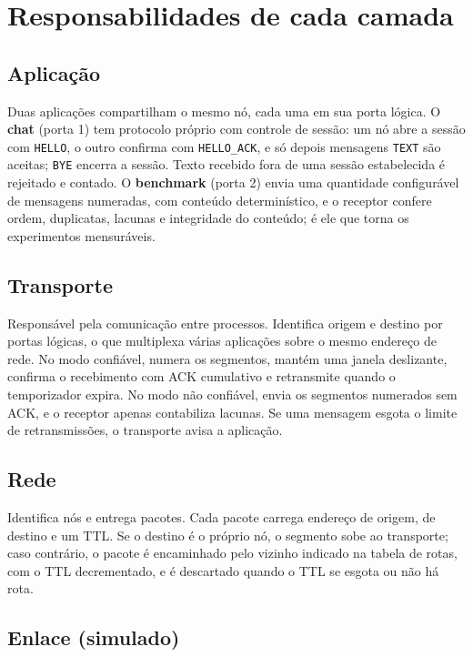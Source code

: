 \documentclass[11pt,a4paper]{article}
\begin{document}
\section{Responsabilidades de cada camada}

\subsection{Aplica\c{c}\~ao}

Duas aplica\c{c}\~oes compartilham o mesmo n\'o, cada uma em sua porta l\'ogica. O \textbf{chat} (porta 1) tem protocolo pr\'oprio com controle de sess\~ao: um n\'o abre a sess\~ao com \texttt{HELLO}, o outro confirma com \texttt{HELLO\_ACK}, e s\'o depois mensagens \texttt{TEXT} s\~ao aceitas; \texttt{BYE} encerra a sess\~ao. Texto recebido fora de uma sess\~ao estabelecida \'e rejeitado e contado. O \textbf{benchmark} (porta 2) envia uma quantidade configur\'avel de mensagens numeradas, com conte\'udo determin\'istico, e o receptor confere ordem, duplicatas, lacunas e integridade do conte\'udo; \'e ele que torna os experimentos mensur\'aveis.

\subsection{Transporte}

Respons\'avel pela comunica\c{c}\~ao entre processos. Identifica origem e destino por portas l\'ogicas, o que multiplexa v\'arias aplica\c{c}\~oes sobre o mesmo endere\c{c}o de rede. No modo confi\'avel, numera os segmentos, mant\'em uma janela deslizante, confirma o recebimento com ACK cumulativo e retransmite quando o temporizador expira. No modo n\~ao confi\'avel, envia os segmentos numerados sem ACK, e o receptor apenas contabiliza lacunas. Se uma mensagem esgota o limite de retransmiss\~oes, o transporte avisa a aplica\c{c}\~ao.

\subsection{Rede}

Identifica n\'os e entrega pacotes. Cada pacote carrega endere\c{c}o de origem, de destino e um TTL. Se o destino \'e o pr\'oprio n\'o, o segmento sobe ao transporte; caso contr\'ario, o pacote \'e encaminhado pelo vizinho indicado na tabela de rotas, com o TTL decrementado, e \'e descartado quando o TTL se esgota ou n\~ao h\'a rota.

\subsection{Enlace (simulado)}
\end{document}
